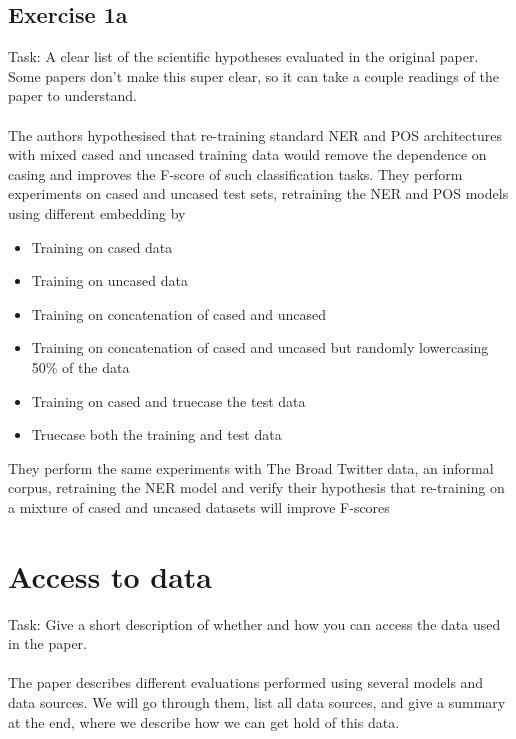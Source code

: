 \documentclass{article}
\begin{document}
\subsection*{Exercise 1a}
Task: A clear list of the scientific hypotheses evaluated in the original paper. Some papers don't make this super clear, so it can take a couple readings of the paper to understand.
\\
\\
The authors hypothesised that re-training standard NER and POS architectures with mixed cased and uncased training data would remove the dependence on casing and improves the F-score of such classification tasks. They perform experiments on cased and uncased test sets, retraining the NER and POS models using different embedding by 
\begin{itemize}
    \item Training on cased data
    \item Training on uncased data
    \item Training on concatenation of cased and uncased
    \item Training on concatenation of cased and uncased but randomly lowercasing 50\% of the data
    \item Training on cased and truecase the test data
    \item Truecase both the training and test data
\end{itemize}

They perform the same experiments with The Broad Twitter data, an informal corpus, retraining the NER model and verify their hypothesis that re-training on a mixture of cased and uncased datasets will improve F-scores




\section{Access to data}
Task: Give a short description of whether and how you can access the data used in the paper.
\\
\\
The paper describes different evaluations performed using several models and data sources. We will go through them, list all data sources, and give a summary at the end, where we describe how we can get hold of this data.
\end{document}
